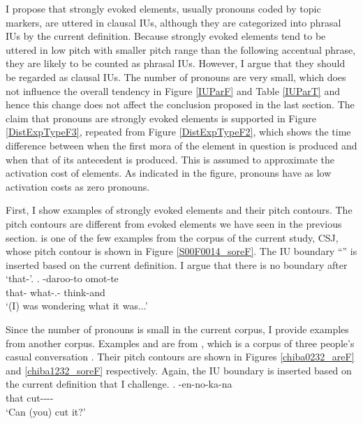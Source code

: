I propose that strongly evoked elements, usually pronouns coded by topic markers, are uttered in clausal IUs,
although they are categorized into phrasal IUs by the current definition.
Because strongly evoked elements tend to be uttered in low pitch with smaller pitch range than the following accentual phrase,
they are likely to be counted as phrasal IUs.
However, I argue that they should be regarded as clausal IUs.
The number of pronouns are very small, which does not influence the overall tendency in Figure \ref{IUParF} and Table \ref{IUParT} and
hence this change does not affect the conclusion proposed in the last section.
The claim that pronouns are strongly evoked elements
is supported in
Figure \ref{DistExpTypeF3},
repeated from Figure \ref{DistExpTypeF2},
which shows the time difference between
when the first mora of the element in question is produced and
when that of its antecedent is produced.
This is assumed to approximate the activation cost of elements.
As indicated in the figure,
pronouns have as low activation costs as zero pronouns.

First, I show examples of strongly evoked elements and their pitch contours.
The pitch contours are different from evoked elements we have seen
in the previous section.
\Next is one of the few examples from the corpus of the current study, CSJ,
whose pitch contour is shown in Figure \ref{S00F0014_soreF}.
The IU boundary ``\iub'' is inserted based on the current definition.
I argue that there is no boundary after  `that-'.
%
\exg.\label{S00F0014_sore} \tp{\dvline} -daroo-to omot-te \tp{\dvline} \\
		that- {} what-.- think-and {} \\
		`(I) was wondering what it was...'

Since the number of pronouns is small in the current corpus,
I provide examples from another corpus.
Examples \Next and \NNext are from
,
which is a corpus of three people's casual conversation \cite{Den_2007_SAC}.
Their pitch contours are shown in Figures \ref{chiba0232_areF} and \ref{chiba1232_soreF} respectively.
Again, the IU boundary is inserted based on the current definition
that I challenge.
%
\exg.\label{chiba0232_are} \tp{\dvline} -en-no-ka-na \tp{\dvline} \\
		that {} cut---\ab{q}- {} \\
		`Can (you) cut it?'

